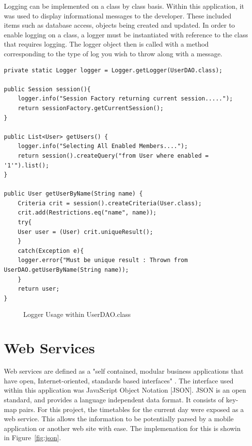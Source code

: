Logging can be implemented on a class by class basis. Within this application, it was used to display informational messages to the developer. These included items such as database access, objects being created and updated. In order to enable logging on a class, a logger must be instantiated with reference to the class that requires logging. The logger object then is called with a method corresponding to the type of log you wish to throw along with a message.

\begin{lstlisting}
private static Logger logger = Logger.getLogger(UserDAO.class);

public Session session(){ 
	logger.info("Session Factory returning current session.....");
	return sessionFactory.getCurrentSession();
}

public List<User> getUsers() {
	logger.info("Selecting All Enabled Members....");
	return session().createQuery("from User where enabled = '1'").list();
}

public User getUserByName(String name) {
	Criteria crit = session().createCriteria(User.class);
	crit.add(Restrictions.eq("name", name)); 
	try{
	User user = (User) crit.uniqueResult();
	}
	catch(Exception e){
	logger.error{"Must be unique result : Thrown from UserDAO.getUserByName(String name));
	}
	return user;
}
\end{lstlisting}
\begin{figure}[H]
\caption{Logger Usage within UserDAO.class}
\end{figure}

\section{Web Services}

Web services are defined as a "self contained, modular business  applications that have open, Internet-oriented, standards based interfaces" \parencite{alonso2004web}. The interface used within this application was JavaScript Object Notation [JSON]. JSON is an open standard, and provides a language independent data format. It consists of key-map pairs. For this project, the timetables for the current day were exposed as a web service. This allows the information to be potentially parsed by a mobile application or another web site with ease. The implemenation for this is showin in Figure~\ref{fig:json}.

